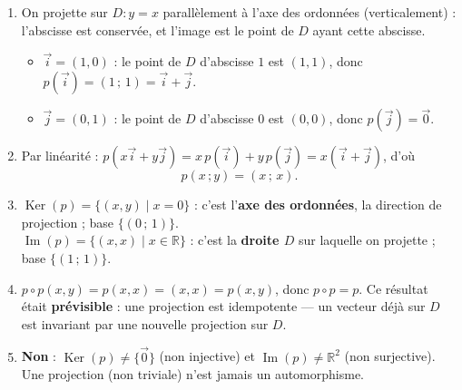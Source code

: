 \documentclass[11pt]{article}
\begin{document}
\begin{corrige}
\begin{enumerate}
\item On projette sur $D:y=x$ parallèlement à l'axe des ordonnées (verticalement) : l'abscisse est conservée, et l'image est le point de $D$ ayant cette abscisse.
\begin{itemize}
\item $\vec{i}=(1,0)$ : le point de $D$ d'abscisse $1$ est $(1,1)$, donc $p(\vec{i})=(1\,;\,1)=\vec{i}+\vec{j}$.
\item $\vec{j}=(0,1)$ : le point de $D$ d'abscisse $0$ est $(0,0)$, donc $p(\vec{j})=\vec{0}$.
\end{itemize}
\item Par linéarité : $p(x\vec{i}+y\vec{j})=x\,p(\vec{i})+y\,p(\vec{j})=x(\vec{i}+\vec{j})$, d'où
\[ p(x\,;y)=(x\,;\,x). \]
\item $\operatorname{Ker}(p)=\{(x,y)\mid x=0\}$ : c'est l'\textbf{axe des ordonnées}, la direction de projection ; base $\{(0\,;\,1)\}$.\\
$\operatorname{Im}(p)=\{(x,x)\mid x\in\mathbb{R}\}$ : c'est la \textbf{droite $D$} sur laquelle on projette ; base $\{(1\,;\,1)\}$.
\item $p\circ p(x,y)=p(x,x)=(x,x)=p(x,y)$, donc $p\circ p=p$. Ce résultat était \textbf{prévisible} : une projection est idempotente — un vecteur déjà sur $D$ est invariant par une nouvelle projection sur $D$.
\item \textbf{Non} : $\operatorname{Ker}(p)\neq\{\vec{0}\}$ (non injective) et $\operatorname{Im}(p)\neq\mathbb{R}^2$ (non surjective). Une projection (non triviale) n'est jamais un automorphisme.
\end{enumerate}
\end{corrige}
\end{document}
